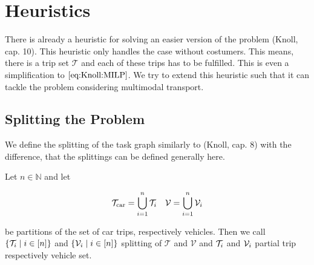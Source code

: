 \section{Heuristics}

There is already a heuristic for solving an easier version of the problem (Knoll, cap. 10). This heuristic only handles the case without costumers. This means, there is a trip set $\mathcal{T}$ and each of these trips has to be fulfilled. This is even a simplification to $\eqref{eq:Knoll:MILP}$. We try to extend this heuristic such that it can tackle the problem considering multimodal transport. 

\subsection{Splitting the Problem}

We define the splitting of the task graph similarly to (Knoll, cap. 8) with the difference, that the splittings can be defined generally here.

\begin{definition}[Splitting]
\label{def:splitting}

Let $n\in\mathbb{N}$ and let

\begin{align*}
	\mathcal{T}_{\operatorname{car}}=\bigcup_{i=1}^n\mathcal{T}_i && \mathcal{V}=\bigcup_{i=1}^n\mathcal{V}_i
\end{align*}

be partitions of the set of car trips, respectively vehicles. Then we call $\left\{\mathcal{T}_i\mid i\in[n]\right\}$ and $\left\{\mathcal{V}_i\mid i\in[n]\right\}$ splitting of $\mathcal{T}$ and $\mathcal{V}$ and $\mathcal{T}_i$ and $\mathcal{V}_i$ partial trip respectively vehicle set.

\end{definition}

